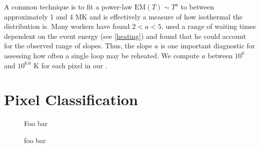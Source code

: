 A common technique is to fit a power-law $\mathrm{EM}(T)\sim T^a$ to \dem between approximately 1 and 4 MK and is effectively a measure of how isothermal the distribution is. Many workers \citep[see Table 3 of][and references therein]{bradshaw_diagnosing_2012} have found $2<a<5$. \citet{cargill_active_2014} used a range of waiting times dependent on the event energy (see \autoref{heating}) and found that he could account for the observed range of slopes. Thus, the \dem slope $a$ is one important diagnostic for assessing how often a single loop may be reheated. We compute $a$ between $10^6$ and $10^{6.6}$ K for each pixel in our \AR{}.

\section{Pixel Classification}\label{classify}


\begin{figure*}
    \caption{Foo bar}
    \label{fig:probability_maps}
\end{figure*}


\begin{figure}
    \caption{foo bar}
    \label{fig:frequency_map}
\end{figure}